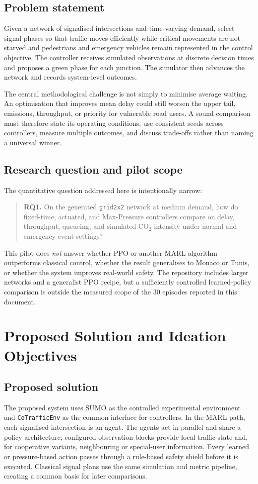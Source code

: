 \documentclass[11pt,a4paper]{article}
\begin{document}
\subsection{Problem statement}
Given a network of signalised intersections and time-varying demand, select signal
phases so that traffic moves efficiently while critical movements are not starved and
pedestrians and emergency vehicles remain represented in the control objective. The
controller receives simulated observations at discrete decision times and proposes a
green phase for each junction. The simulator then advances the network and records
system-level outcomes.

The central methodological challenge is not simply to minimise average waiting. An
optimisation that improves mean delay could still worsen the upper tail, emissions,
throughput, or priority for vulnerable road users. A sound comparison must therefore
state its operating conditions, use consistent seeds across controllers, measure
multiple outcomes, and discuss trade-offs rather than naming a universal winner.

\subsection{Research question and pilot scope}
The quantitative question addressed here is intentionally narrow:
\begin{quote}
\textbf{RQ1.} On the generated \texttt{grid2x2} network at medium demand, how do
fixed-time, actuated, and Max-Pressure controllers compare on delay, throughput,
queueing, and simulated CO$_2$ intensity under normal and emergency event settings?
\end{quote}

This pilot does \emph{not} answer whether PPO or another MARL algorithm outperforms
classical control, whether the result generalises to Monaco or Tunis, or whether the
system improves real-world safety. The repository includes larger networks and a
generalist PPO recipe, but a sufficiently controlled learned-policy comparison is
outside the measured scope of the 30 episodes reported in this document.

\section{Proposed Solution and Ideation Objectives}
\subsection{Proposed solution}
The proposed system uses SUMO as the controlled experimental environment and
\texttt{CoTrafficEnv} as the common interface for controllers. In the MARL path, each
signalised intersection is an agent. The agents act in parallel and share a policy
architecture; configured observation blocks provide local traffic state and, for
cooperative variants, neighbouring or special-user information. Every learned or
pressure-based action passes through a rule-based safety shield before it is executed.
Classical signal plans use the same simulation and metric pipeline, creating a common
basis for later comparisons.
\end{document}
